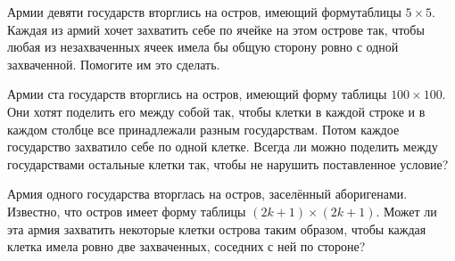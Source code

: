 ﻿
\begin{itemize}

\itA Армии девяти государств вторглись на остров, имеющий форму\linebreak таблицы $5 \times 5$. Каждая из армий хочет захватить себе по ячейке на этом острове так, чтобы любая из незахваченных ячеек имела бы общую сторону ровно с одной захваченной. Помогите им это сделать.

\itB Армии ста государств вторглись на остров, имеющий форму таблицы $100 \times 100$. Они хотят поделить его между собой так, чтобы клетки в каждой строке и в каждом столбце все принадлежали разным государствам. Потом каждое государство захватило себе по одной клетке. Всегда ли можно поделить между государствами остальные клетки так, чтобы не нарушить поставленное условие?

\itC Армия одного государства вторглась на остров, заселённый аборигенами. Известно, что остров имеет форму таблицы $(2k+1) \times (2k+1)$. Может ли эта армия захватить некоторые клетки острова таким образом, чтобы каждая клетка имела ровно две захваченных, соседних с ней по стороне?
\end{itemize}